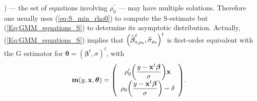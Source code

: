 ) --- the set of equations involving $\rho_{0}^{\prime}$ --- may have multiple
solutions. Therefore one usually uses (\ref{eq:S_min_rho0}) to compute the
S-estimate but (\ref{Eq:GMM_equations_S}) to determine its asymptotic
distribution. Actually, (\ref{Eq:GMM_equations_S}) implies that $\left(
\sthat{\boldsymbol\beta}_{\stsc{S};\rho_{0}}^{t},\sthat{\sigma}%
_{\rho_{0}}\right)  ^{t}$ is first-order equivalent with the G estimator for
$\boldsymbol{\theta}=\left(  \boldsymbol\beta^{t},\sigma\right)  ^{t}$,
with
\[
\mathbf{m}\left(  y,\stvec{x},\boldsymbol{\theta}\right)  =\left(
\begin{array}
[c]{c}%
\rho_{0}^{\prime}\left(  \dfrac{y-\stvec{x}^{t}\boldsymbol\beta}{\sigma
}\right)  \stvec{x}\\
\rho_{0}\left(  \dfrac{y-\stvec{x}^{t}\boldsymbol\beta}{\sigma}\right)
-\delta
\end{array}
\right)  .
\]


